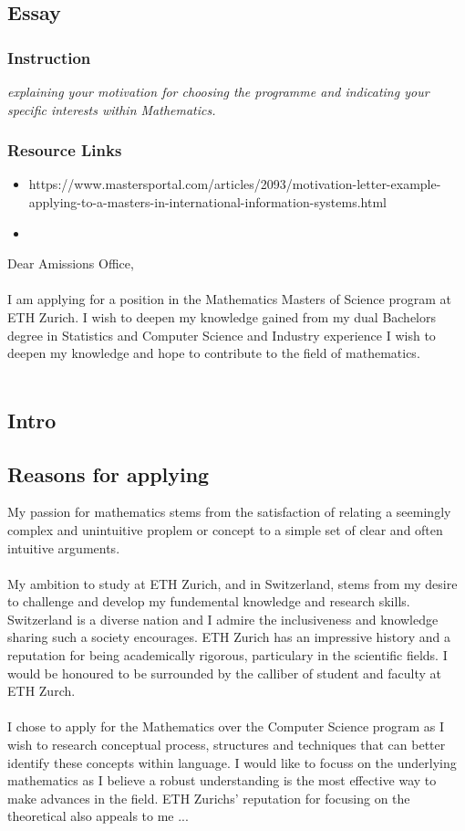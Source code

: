 \subsection*{Essay}\label{sec:essay}

\subsubsection*{Instruction}
\textit{explaining your motivation for choosing the programme and indicating your specific interests within Mathematics.}

\subsubsection*{Resource Links}
\begin{itemize}
    \item https://www.mastersportal.com/articles/2093/motivation-letter-example-applying-to-a-masters-in-international-information-systems.html
    \item 
\end{itemize}

Dear Amissions Office,\\
\\
I am applying for a position in the Mathematics Masters of Science program at ETH Zurich. I wish to deepen my knowledge gained from my dual Bachelors degree in Statistics and Computer Science and Industry experience I wish to deepen my knowledge and hope to contribute to the field of mathematics.\\
\\
\subsection*{Intro}
\subsection*{Reasons for applying}
My passion for mathematics stems from the satisfaction of relating a seemingly complex and unintuitive proplem or concept to a simple set of clear and often intuitive arguments.\\
\\
My ambition to study at ETH Zurich, and in Switzerland, stems from my desire to challenge and develop my fundemental knowledge and research skills. Switzerland is a diverse nation and I admire the inclusiveness and knowledge sharing such a society encourages. ETH Zurich has an impressive history and a reputation for being academically rigorous, particulary in the scientific fields. I would be honoured to be surrounded by the calliber of student and faculty at ETH Zurch.\\
\\
I chose to apply for the Mathematics over the Computer Science program as I wish to research conceptual process, structures and techniques that can better identify these concepts within language. I would like to focuss on the underlying mathematics as I believe a robust understanding is the most effective way to make advances in the field. ETH Zurichs' reputation for focusing on the theoretical also appeals to me ...
\\

